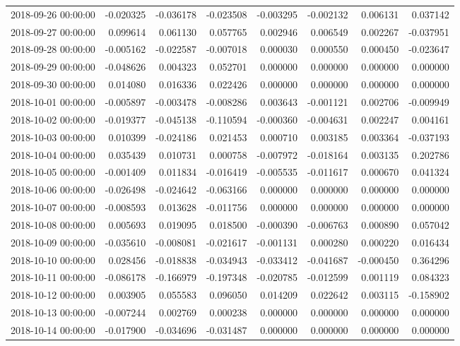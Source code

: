 \begin{tabular}{lrrrrrrr}
2018-09-26 00:00:00 & -0.020325 & -0.036178 & -0.023508 & -0.003295 & -0.002132 & 0.006131 & 0.037142 \\
2018-09-27 00:00:00 & 0.099614 & 0.061130 & 0.057765 & 0.002946 & 0.006549 & 0.002267 & -0.037951 \\
2018-09-28 00:00:00 & -0.005162 & -0.022587 & -0.007018 & 0.000030 & 0.000550 & 0.000450 & -0.023647 \\
2018-09-29 00:00:00 & -0.048626 & 0.004323 & 0.052701 & 0.000000 & 0.000000 & 0.000000 & 0.000000 \\
2018-09-30 00:00:00 & 0.014080 & 0.016336 & 0.022426 & 0.000000 & 0.000000 & 0.000000 & 0.000000 \\
2018-10-01 00:00:00 & -0.005897 & -0.003478 & -0.008286 & 0.003643 & -0.001121 & 0.002706 & -0.009949 \\
2018-10-02 00:00:00 & -0.019377 & -0.045138 & -0.110594 & -0.000360 & -0.004631 & 0.002247 & 0.004161 \\
2018-10-03 00:00:00 & 0.010399 & -0.024186 & 0.021453 & 0.000710 & 0.003185 & 0.003364 & -0.037193 \\
2018-10-04 00:00:00 & 0.035439 & 0.010731 & 0.000758 & -0.007972 & -0.018164 & 0.003135 & 0.202786 \\
2018-10-05 00:00:00 & -0.001409 & 0.011834 & -0.016419 & -0.005535 & -0.011617 & 0.000670 & 0.041324 \\
2018-10-06 00:00:00 & -0.026498 & -0.024642 & -0.063166 & 0.000000 & 0.000000 & 0.000000 & 0.000000 \\
2018-10-07 00:00:00 & -0.008593 & 0.013628 & -0.011756 & 0.000000 & 0.000000 & 0.000000 & 0.000000 \\
2018-10-08 00:00:00 & 0.005693 & 0.019095 & 0.018500 & -0.000390 & -0.006763 & 0.000890 & 0.057042 \\
2018-10-09 00:00:00 & -0.035610 & -0.008081 & -0.021617 & -0.001131 & 0.000280 & 0.000220 & 0.016434 \\
2018-10-10 00:00:00 & 0.028456 & -0.018838 & -0.034943 & -0.033412 & -0.041687 & -0.000450 & 0.364296 \\
2018-10-11 00:00:00 & -0.086178 & -0.166979 & -0.197348 & -0.020785 & -0.012599 & 0.001119 & 0.084323 \\
2018-10-12 00:00:00 & 0.003905 & 0.055583 & 0.096050 & 0.014209 & 0.022642 & 0.003115 & -0.158902 \\
2018-10-13 00:00:00 & -0.007244 & 0.002769 & 0.000238 & 0.000000 & 0.000000 & 0.000000 & 0.000000 \\
2018-10-14 00:00:00 & -0.017900 & -0.034696 & -0.031487 & 0.000000 & 0.000000 & 0.000000 & 0.000000 \\

\end{tabular}
